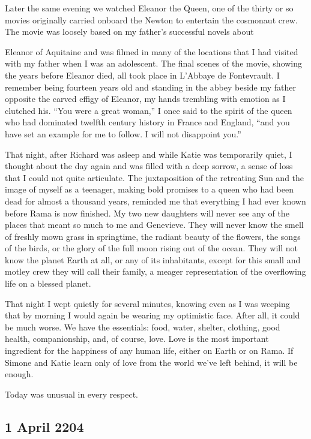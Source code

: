 \documentclass[]{article}
\begin{document}
Later the same evening we watched Eleanor the Queen, one of the thirty or so movies originally carried onboard the Newton to entertain the cosmonaut crew.  The movie was loosely based on my father’s successful novels about

Eleanor of Aquitaine and was filmed in many of the locations that I had visited with my father when I was an adolescent.  The final scenes of the movie, showing the years before Eleanor died, all took place in L’Abbaye de Fontevrault.  I remember being fourteen years old and standing in the abbey beside my father opposite the carved effigy of Eleanor, my hands trembling with emotion as I clutched his.  “You were a great woman,” I once said to the spirit of the queen who had dominated twelfth century history in France and England, “and you have set an example for me to follow.  I will not disappoint you.”

That night, after Richard was asleep and while Katie was temporarily quiet, I thought about the day again and was filled with a deep sorrow, a sense of loss that I could not quite articulate.  The juxtaposition of the retreating Sun and the image of myself as a teenager, making bold promises to a queen who had been dead for almost a thousand years, reminded me that everything I had ever known before Rama is now finished.  My two new daughters will never see any of the places that meant so much to me and Genevieve.  They will never know the smell of freshly mown grass in springtime, the radiant beauty of the flowers, the songs of the birds, or the glory of the full moon rising out of the ocean.  They will not know the planet Earth at all, or any of its inhabitants, except for this small and motley crew they will call their family, a meager representation of the overflowing life on a blessed planet.

That night I wept quietly for several minutes, knowing even as I was weeping that by morning I would again be wearing my optimistic face.  After all, it could be much worse.  We have the essentials: food, water, shelter, clothing, good health, companionship, and, of course, love.  Love is the most important ingredient for the happiness of any human life, either on Earth or on Rama.  If Simone and Katie learn only of love from the world we’ve left behind, it will be enough.

Today was unusual in every respect.

\subsection*{1 April 2204}
\end{document}
